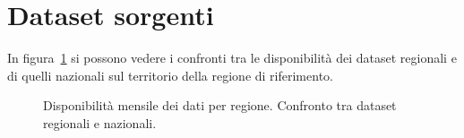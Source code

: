 \section{Dataset sorgenti}\label{sec:datasets}
In figura~\ref{fig:regional-monthly} si possono vedere i confronti tra le disponibilità dei dataset regionali e di quelli nazionali sul territorio della regione di riferimento.
\begin{figure}
  \centering
  
  \caption{Disponibilità mensile dei dati per regione. Confronto tra dataset regionali e nazionali.}\label{fig:regional-monthly}
\end{figure}
